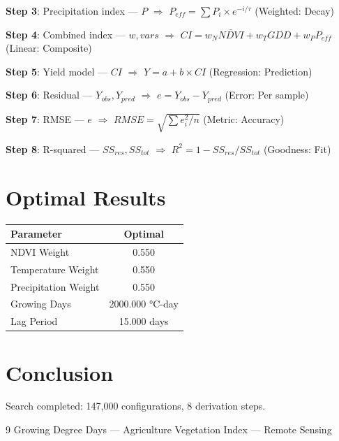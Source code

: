 \documentclass[11pt,twocolumn]{article}
\begin{document}
\textbf{Step 3}: Precipitation index --- $P$ $\Rightarrow$ $P_{eff} = \sum P_i \times e^{-i/\tau}$ (Weighted: Decay)


\textbf{Step 4}: Combined index --- $w, vars$ $\Rightarrow$ $CI = w_N \bar{NDVI} + w_T GDD + w_P P_{eff}$ (Linear: Composite)


\textbf{Step 5}: Yield model --- $CI$ $\Rightarrow$ $Y = a + b \times CI$ (Regression: Prediction)


\textbf{Step 6}: Residual --- $Y_{obs}, Y_{pred}$ $\Rightarrow$ $e = Y_{obs} - Y_{pred}$ (Error: Per sample)


\textbf{Step 7}: RMSE --- $e$ $\Rightarrow$ $RMSE = \sqrt{\sum e_i^2/n}$ (Metric: Accuracy)


\textbf{Step 8}: R-squared --- $SS_{res}, SS_{tot}$ $\Rightarrow$ $R^2 = 1 - SS_{res}/SS_{tot}$ (Goodness: Fit)


\section{Optimal Results}
\begin{table}[h]
\centering
\begin{tabular}{@{}lc@{}}
\toprule
Parameter & Optimal \\
\midrule
NDVI Weight & 0.550  \\
Temperature Weight & 0.550  \\
Precipitation Weight & 0.550  \\
Growing Days & 2000.000 °C-day \\
Lag Period & 15.000 days \\
\bottomrule
\end{tabular}
\end{table}

\section{Conclusion}
Search completed: 147,000 configurations, 8 derivation steps.

\begin{thebibliography}{9}
 Growing Degree Days --- Agriculture
 Vegetation Index --- Remote Sensing
\end{thebibliography}
\end{document}
